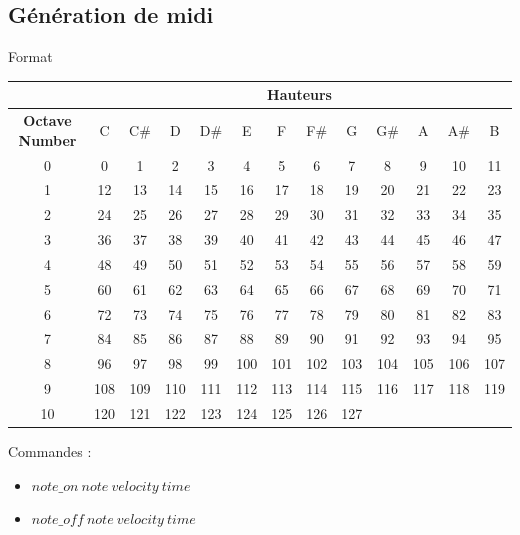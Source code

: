 \documentclass{beamer}
\begin{document}
\subsection{Génération de midi}

\begin{frame}{Format}
\begin{tiny}
\begin{center}
\begin{tabular}{|c|c|c|c|c|c|c|c|c|c|c|c|c|}
\hline
 & \multicolumn{12}{c|}{\textbf{Hauteurs}} \\
\hline
\textbf{Octave Number} & C & C\# & D & D\# & E & F & F\# & G & G\# & A & A\# & B  \\
\hline
0 & 0 & 1 & 2 & 3 & 4 & 5 & 6 & 7 & 8 & 9 & 10 & 11  \\
\hline
1 & 12 & 13 & 14 & 15 & 16 & 17 & 18 & 19 & 20 & 21 & 22 & 23  \\
\hline
2 & 24 & 25 & 26 & 27 & 28 & 29 & 30 & 31 & 32 & 33 & 34 & 35  \\
\hline
3 & 36 & 37 & 38 & 39 & 40 & 41 & 42 & 43 & 44 & 45 & 46 & 47  \\
\hline
4 & 48 & 49 & 50 & 51 & 52 & 53 & 54 & 55 & 56 & 57 & 58 & 59  \\
\hline
5 & 60 & 61 & 62 & 63 & 64 & 65 & 66 & 67 & 68 & 69 & 70 & 71  \\
\hline
6 & 72 & 73 & 74 & 75 & 76 & 77 & 78 & 79 & 80 & 81 & 82 & 83  \\
\hline
7 & 84 & 85 & 86 & 87 & 88 & 89 & 90 & 91 & 92 & 93 & 94 & 95  \\
\hline
8 & 96 & 97 & 98 & 99 & 100 & 101 & 102 & 103 & 104 & 105 & 106 & 107  \\
\hline
9 & 108 & 109 & 110 & 111 & 112 & 113 & 114 & 115 & 116 & 117 & 118 & 119  \\
\hline
10 & 120 & 121 & 122 & 123 & 124 & 125 & 126 & 127 &   &   &   & \\
\hline
\end{tabular}
\end{center}
\end{tiny}
Commandes :
\begin{itemize}
\item $note\_on \ note \ velocity \ time$
\item $note\_off \ note \ velocity \ time$
\end{itemize}
\end{frame}
\end{document}
